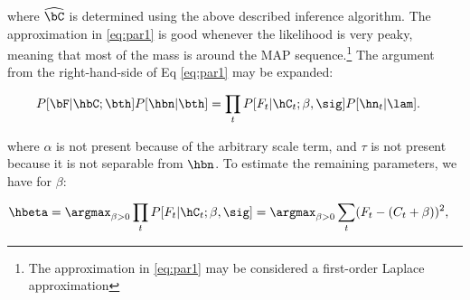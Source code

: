 % 
% 
\noindent where $\hCm$ is determined using the above described inference algorithm. The approximation in \eqref{eq:par1} is good whenever the likelihood is very peaky, meaning that most of the mass is around the MAP sequence.\footnote{The approximation in \eqref{eq:par1} may be considered a first-order Laplace approximation}  
The argument from the right-hand-side of Eq \eqref{eq:par1} may be expanded: %

\begin{align} \label{eq:par2}
P[\bF| \hbC; \bth] P[\hbn | \bth] &= \prod_t P[F_t | \hC_t; \beta,\sig]  P[\hn_t | \lam].
\end{align}

\noindent where $\alpha$ is not present because of the arbitrary scale term, and $\tau$ is not present because it is not separable from $\hbn$. To estimate the remaining parameters, we have for $\beta$:

\begin{align}
	\hbeta &= \argmax_{\beta >0} \prod_t P[F_t | \hC_t; \beta,\sig] = \argmax_{\beta>0} \sum_t (F_t - (C_t + \beta))^2,
\end{align}

